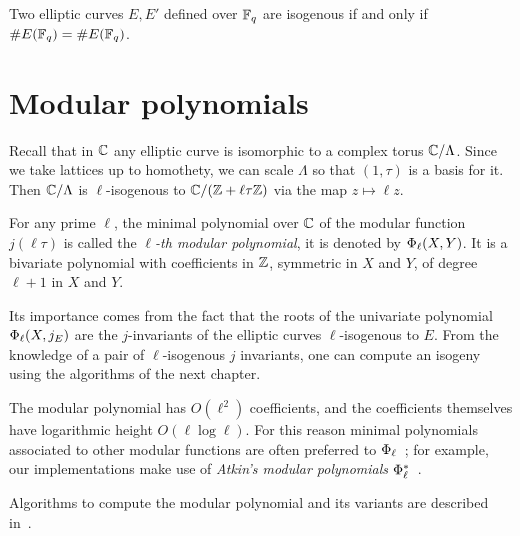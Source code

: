 \begin{theorem}
  Two elliptic curves $E,E'$ defined over $\mathbb{F}_q$ are isogenous if and
  only if $\# E(\mathbb{F}_q)=\# E(\mathbb{F}_q)$.
\end{theorem}


\section{Modular polynomials}
\label{sec:modular-polynomials}
Recall that in $\mathbb{C}$ any elliptic curve is isomorphic to a complex
torus $\mathbb{C}/\Lambda$. Since we take lattices up to homothety, we can
scale $\Lambda$ so that $(1,\tau)$ is a basis for it. Then
$\mathbb{C}/\Lambda$ is $\ell$-isogenous to $\mathbb{C}/(\mathbb{Z}+\ell\tau\mathbb{Z})$ via the map
$z\mapsto\ell z$.

  For any prime
$\ell$, the minimal polynomial over $\mathbb{C}$ of the modular function
$j(\ell\tau)$ is called the \emph{$\ell$-th
  modular polynomial}, it is denoted by
$\Phi_\ell(X,Y)$. It is a bivariate polynomial with coefficients in $\mathbb{Z}$,
symmetric in $X$ and $Y$, of degree $\ell+1$ in $X$ and $Y$.

Its importance comes from the fact that the roots of the univariate
polynomial $\Phi_\ell(X,j_E)$ are the $j$-invariants of the
elliptic curves $\ell$-isogenous to $E$. From the knowledge of a pair
of $\ell$-isogenous $j$ invariants, one can compute an isogeny using
the algorithms of the next chapter.

  The modular polynomial has $O(\ell^2)$
coefficients, and the coefficients themselves have logarithmic height
$O(\ell\log\ell)$. For this reason minimal polynomials associated to
other modular functions are often preferred to
$\Phi_\ell$~\cite{atkin88,enge+sutherland10}; for example, our
implementations make use of \emph{Atkin's modular polynomials}
$\Phi_\ell^\ast$~\cite{atkin88}.

Algorithms to compute the modular polynomial and its variants are
described in~\cite{morain95,sutherland10:modpol,enge+sutherland10}.







%
